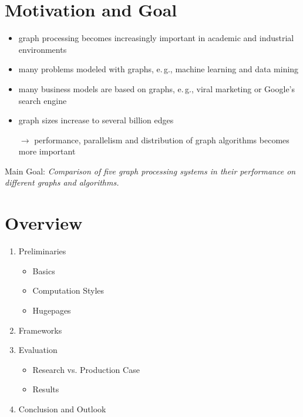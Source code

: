 \documentclass{meetings}
\author{S. König, L. Matzner, F. Rollbühler and J. Schmid}
\date{Tuesday, 20\textsuperscript{th} October 2020}
\begin{document}
\section{Motivation and Goal}
\sffamily
\begin{center}

	\vfill

	\begin{itemize}
		\item graph processing becomes increasingly important in academic and industrial environments
		\item many problems modeled with graphs, e.\,g.,\xspace machine learning and data mining
		\item many business models are based on graphs, e.\,g.,\xspace viral marketing or Google’s search engine
		\item graph sizes increase to several billion edges
		\item[$\rightarrow$] performance, parallelism and distribution of graph algorithms becomes more important
	\end{itemize}

	\vfill

	\begin{minipage}{0.6\linewidth}
		\centering
		Main Goal: \itshape  Comparison of five graph processing systems in their performance on different graphs and algorithms.
	\end{minipage}

	\vfill
\end{center}


\section{Overview}
{\large
\begin{enumerate}
	\item Preliminaries
	\begin{itemize}
	\item Basics
	\item Computation Styles
	\item Hugepages
	\end{itemize}
	\item Frameworks
	\item Evaluation
	\begin{itemize}
	\item Research vs. Production Case
	\item Results
	\end{itemize}
	\item Conclusion and Outlook
\end{enumerate}
}
\end{document}
